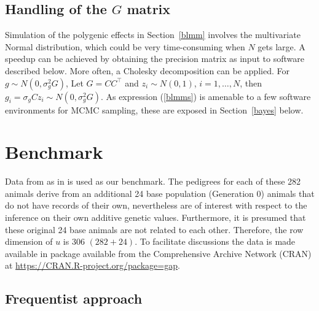\documentclass[article]{jss}
\begin{document}
\subsection{Handling of the $G$ matrix}
Simulation of the polygenic effects in Section~\ref{blmm} involves the
multivariate Normal distribution, which could be very time-consuming
when $N$ gets large. A speedup can be achieved by obtaining the
precision matrix as input to software described below. More often, a
Cholesky decomposition can be applied. For $g\sim N(0,\sigma_g^2G)$,
Let $G=CC^\top$ and $z_i \sim N(0,1)$, $i=1,\ldots,N$, then
$g_i=\sigma_g C z_i\sim N(0,\sigma_g^2G)$.  As expression
(\ref{blmms}) is amenable to a few software environments for MCMC
sampling, these are exposed in Section~\ref{bayes} below.

\section{Benchmark}

Data from \cite{meyer89} as in \cite{tempelman04} is used as our
benchmark. The pedigrees for each of these 282 animals derive from an
additional 24 base population (Generation 0) animals that do not have
records of their own, nevertheless are of interest with respect to the
inference on their own additive genetic values. Furthermore, it is
presumed that these original 24 base animals are not related to each
other. Therefore, the row dimension of $u$ is $306$ $(282+24)$. To
facilitate discussions the data is made available in package 
available from the Comprehensive  Archive Network (CRAN)
at \url{https://CRAN.R-project.org/package=gap}.

\subsection{Frequentist approach}
\end{document}
